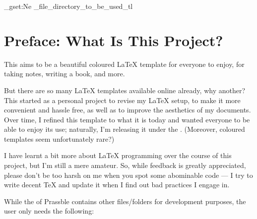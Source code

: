 \documentclass[11pt, a4paper]{book}
\begin{document}
\ExplSyntaxOn
    \tl_gset:Ne \g_file_directory_to_be_used_tl {}
\ExplSyntaxOff
\frontmatter
{}
\thispagestyle{empty} 
%
\chapter{Preface: What Is This Project?}
This aims to be a beautiful coloured {\LaTeX} template for everyone to enjoy, for taking notes, writing a book, and more. 

But there are so many {\LaTeX} templates available online already, why another? This started as a personal project to revise my {\LaTeX} setup, to make it more convenient and hassle free, as well as to improve the aesthetics of my documents. Over time, I refined this template to what it is today and wanted everyone to be able to enjoy its use; naturally, I'm releasing it under the . (Moreover, coloured templates seem unfortunately rare?)

I have learnt a bit more about {\LaTeX} programming over the course of this project, but I'm still a mere amateur. So, while feedback is greatly appreciated, please don't be too harsh on me when you spot some abominable code --- I try to write decent {\TeX} and update it when I find out bad practices I engage in.
%
\tableofcontents
\thispagestyle{empty}
\newpage
\setcounter{page}{1}
%
\mainmatter
{}
While the  of Prassble contains other files/folders for development purposes, the user only needs the following:
%
\backmatter
\end{document}
